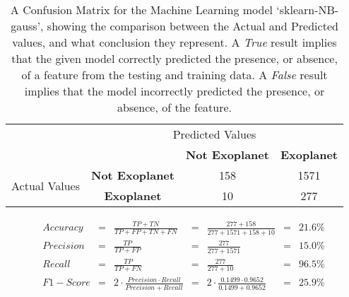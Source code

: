 
    \renewcommand{\arraystretch}{2}
    \renewcommand{\tabcolsep}{20.25pt}
    \vspace{-0.5cm}
    \begin{table}[ht]
    \begin{tabular}{cccc}
     & \multicolumn{3}{c}{Predicted Values} \\ \cline{3-4}
     & \multicolumn{1}{c|}{} & \multicolumn{1}{c|}{\textbf{Not Exoplanet}} & \multicolumn{1}{c|}{\textbf{Exoplanet}} \\ \cline{2-4}
    \multicolumn{1}{c|}{\multirow{2}{2.0cm}{Actual Values}} & \multicolumn{1}{c|}{\textbf{Not Exoplanet}} & \multicolumn{1}{c|}{158} & \multicolumn{1}{c|}{1571} \\ \cline{2-4}
    \multicolumn{1}{c|}{} & \multicolumn{1}{c|}{\textbf{Exoplanet}} & \multicolumn{1}{c|}{10} & \multicolumn{1}{c|}{277} \\ \cline{2-4}
    \end{tabular}
    \caption{A Confusion Matrix for the Machine Learning model `sklearn-NB-gauss', showing the comparison between the Actual and Predicted values, and what conclusion they represent. A \emph{True} result implies that the given model correctly predicted the presence, or absence, of a feature from the testing and training data. A \emph{False} result implies that the model incorrectly predicted the presence, or absence, of the feature.}
    \label{tab:sklearn-NB-gaussconfusionmatrix}
    \end{table}
    \vspace{-0.75cm}
    \label{eq:metrics-sklearn-NB-gauss}
    \begin{align*}
        Accuracy &= &\frac{TP + TN}{TP + FP + TN + FN} &= &\frac{277 + 158}{277 + 1571 + 158 + 10} &= & 21.6\% \\
        Precision &= &\frac{TP}{TP + FP} &= &\frac{277}{277 + 1571} &= & 15.0\% \\
        Recall &= &\frac{TP}{TP + FN} &= &\frac{277}{277 + 10} &= & 96.5\% \\
        F1-Score &= &2 \cdot \frac{Precision \cdot Recall}{Precision + Recall} &= &2 \cdot \frac{0.1499 \cdot 0.9652}{0.1499 + 0.9652} &= & 25.9\% \\
    \end{align*}
    \vspace{-1.75cm}
    \renewcommand{\arraystretch}{1}
    \renewcommand{\tabcolsep}{5.25pt}
    